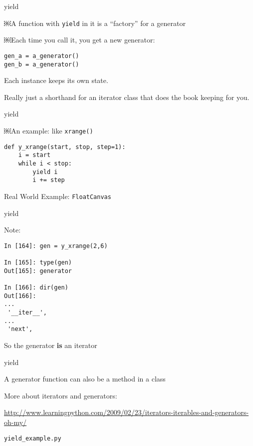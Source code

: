 \documentclass{beamer}
\begin{document}
\begin{frame}[fragile]{yield}

\Large{￼A function with \verb|yield| in it is a ``factory'' for a generator}

\Large{￼Each time you call it, you get a new generator:}
 
\begin{verbatim}
gen_a = a_generator()
gen_b = a_generator()
\end{verbatim}

\vfill
\Large{ Each instance keeps its own state. }

\vfill
\Large{ Really just a shorthand for an iterator class that does the book keeping for you.}

\end{frame}

\begin{frame}[fragile]{yield}

\Large{￼An example: like \verb|xrange()|}

\begin{verbatim}
def y_xrange(start, stop, step=1):
    i = start
    while i < stop:
        yield i
        i += step
\end{verbatim}

\vfill
{\Large Real World Example: \verb|FloatCanvas|}
\end{frame}

\begin{frame}[fragile]{yield}

{\Large Note:}

\begin{verbatim}
In [164]: gen = y_xrange(2,6)

In [165]: type(gen)
Out[165]: generator

In [166]: dir(gen)
Out[166]: 
...
 '__iter__',
...
 'next',
\end{verbatim}
{\Large So the generator {\bf is} an iterator}
\end{frame}

\begin{frame}[fragile]{yield}

{\Large A generator function can also be a method in a class}

\vfill
{\Large More about iterators and generators:}

\url{http://www.learningpython.com/2009/02/23/iterators-iterables-and-generators-oh-my/}

\vfill
\verb|yield_example.py|
\end{frame}
\end{document}
